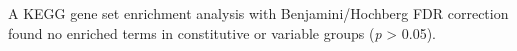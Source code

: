\documentclass[../main.tex]{subfiles}
\begin{document}
A KEGG gene set enrichment analysis with Benjamini/Hochberg FDR correction found no enriched terms in constitutive or variable groups (\textit{p} \textgreater{} 0.05).

%		
%
%		
%
\end{document}
